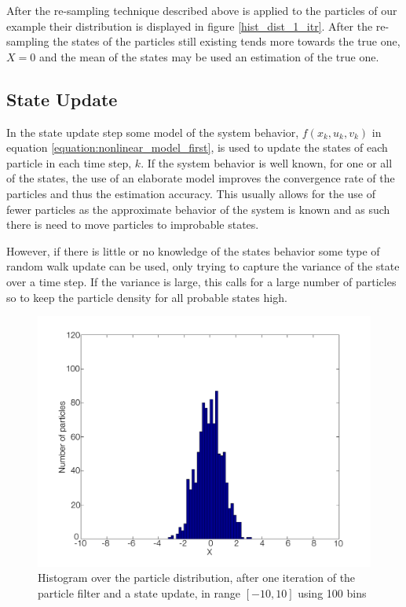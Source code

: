 \documentclass{LTHthesis}
\begin{document}
After the re-sampling technique described above is applied to the particles of our example their distribution is displayed in figure \ref{hist_dist_1_itr}. After the re-sampling the states of the particles still existing tends more towards the true one, $X=0$ and the mean of the states may be used an estimation of the true one.    
% 
\subsection{State Update}
%
In the state update step some model of the system behavior, $f(x_k,u_k,v_k)$ in equation \ref{equation:nonlinear_model_first}, is used to update the states of each particle in each time step, $k$. If the system behavior is well known, for one or all of the states, the use  of an elaborate model improves the convergence rate of the particles and thus the estimation accuracy. This usually allows for the use of fewer particles as the approximate behavior of the system is known and as such there is need to move particles to improbable states. 

However, if there is little or no knowledge of the states behavior some type of random walk update can be used, only trying to capture the variance of the state over a time step. If the variance is large, this calls for a large number of particles so to keep the particle density for all probable states high. 
%
\begin{figure}[!hbt]

\includegraphics[width=1\textwidth ]{images/PF/hist_dist_1_itr_dyn}
\caption{Histogram over the particle distribution, after one iteration of the particle filter and a state update, in range $[-10,10]$ using 100 bins}\label{hist_dist_1_itr_dyn}
\end{figure}
\end{document}

